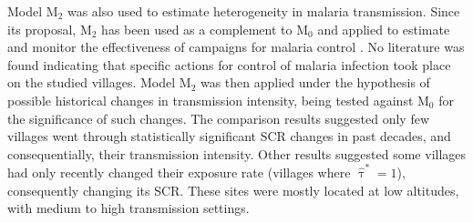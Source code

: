 Model M$_2$ was also used to estimate heterogeneity in malaria transmission.
Since its proposal, M$_2$ has been used as a complement to M$_0$ \cite{dewasurendra2017effectiveness} and applied to estimate and monitor the effectiveness of campaigns for malaria control \cite{cook2010using,cook2011serological}.
No literature was found indicating that specific actions for control of malaria infection took place on the studied villages.
Model M$_2$ was then applied under the hypothesis of possible historical changes in transmission intensity, being tested against M$_0$ for the significance of such changes.
The comparison results suggested only few villages went through statistically significant SCR changes in past decades, and consequentially, their transmission intensity.
Other results suggested some villages had only recently changed their exposure rate (villages where $ \widehat{\uptau}^*=1$), consequently changing its SCR.
These sites were mostly located at low altitudes, with medium to high transmission settings.
